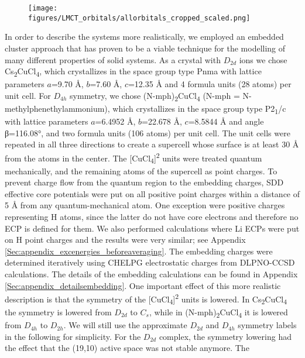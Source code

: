 \begin{figure}
{\texttt{[image: figures/LMCT\_orbitals/allorbitals\_cropped\_scaled.png]}}
\end{figure}

In order to describe the systems more realistically, we employed an embedded cluster approach\cite{Staem_2005_219} that has proven to be a viable technique for the modelling of many different properties of solid systems.\cite{MaganRHTKSN_2013_7260, KubasBOMRN_2016_4207, DittmINM_2019_9303} As a crystal with $D_{2d}$ ions we chose Cs\textsubscript{2}CuCl\textsubscript{4}, which crystallizes in the space group type Pnma with lattice parameters $a$=9.70 Å, $b$=7.60 Å, $c$=12.35 Å and 4 formula units (28 atoms) per unit cell.\cite{HelmhK_1952_1176} For $D_{4h}$ symmetry, we chose (N-mph)\textsubscript{2}CuCl\textsubscript{4} (N-mph = N-methylphenethylammonium), which crystallizes in the space group type P2\textsubscript{1}/c with lattice parameters $a$=6.4952 Å, $b$=22.678 Å, $c$=8.5844 Å and angle β=116.08°, and two formula units (106 atoms) per unit cell.\cite{HarloWWS_1974_2106} The unit cells were repeated in all three directions to create a supercell whose surface is at least 30 Å from the atoms in the center. The [CuCl\textsubscript{4}]\textsuperscript{2\textminus} units were treated quantum mechanically, and the remaining atoms of the supercell as point charges. To prevent charge flow from the quantum region to the embedding charges, SDD effective core potentials\cite{FuentPSV_1982_418, DolgWSP_1987_866, BergnDKSP_1993_1431, LeiniNKSDB_1996_274} were put on all positive point charges within a distance of 5 Å from any quantum-mechanical atom. One exception were positive charges representing H atoms, since the latter do not have core electrons and therefore no ECP is defined for them. We also performed calculations where Li ECPs were put on H point charges and the results were very similar; see Appendix \ref{Sec:appendix_excenergies_beforeaveraging}. The embedding charges were determined iteratively using CHELPG\cite{BreneW_1990_361} electrostatic charges from DLPNO-CCSD\cite{RipliPBVN_2016_24109, SaitoBRVN_2017_164105} calculations. The details of the embedding calculations can be found in Appendix \ref{Sec:appendix_detailsembedding}. One important effect of this more realistic description is that the symmetry of the [CuCl\textsubscript{4}]\textsuperscript{2\textminus} units is lowered. In Cs\textsubscript{2}CuCl\textsubscript{4} the symmetry is lowered from $D_{2d}$ to $C_s$, while in (N-mph)\textsubscript{2}CuCl\textsubscript{4} it is lowered from $D_{4h}$ to $D_{2h}$. We will still use the approximate $D_{2d}$ and $D_{4h}$ symmetry labels in the following for simplicity. For the $D_{2d}$ complex, the symmetry lowering had the effect that the (19,10) active space was not stable anymore. The 